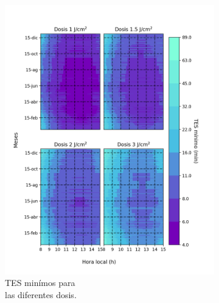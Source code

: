 \documentclass{article}
\begin{document}
\begin{multicols}{2}
\begin{figure}[H]
\begin{subfigure}[H]{0.5\linewidth}
       \includegraphics[scale=0.395]{images/pso.png}
        \changefontsizes{10pt}
        \caption{TES minímos para \\las diferentes dosis.}
    \end{subfigure}
    \begin{subfigure}[H]{0.4\linewidth}
        \centering

\end{subfigure}
\end{figure}
\end{multicols}
\end{document}
